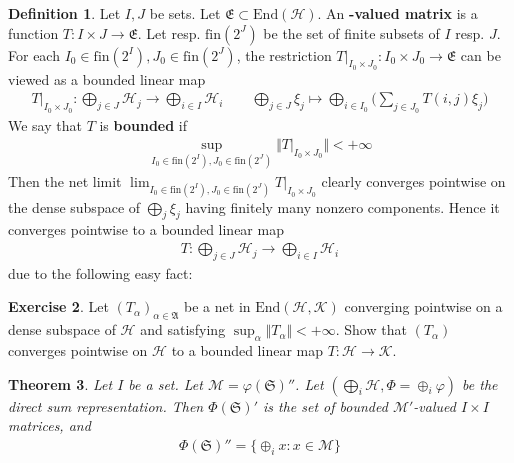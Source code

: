 \documentclass[12pt,b5paper,notitlepage]{article}
\theoremstyle{definition}
\newtheorem{df}{Definition}[section]
\newtheorem{exe}[df]{Exercise}
\theoremstyle{plain}
\newtheorem{thm}[df]{Theorem}
\newcommand{\fk}{\mathfrak}
\newcommand{\mc}{\mathcal}
\newcommand{\End}{\mathrm{End}} %
\newcommand{\fin}{\mathrm{fin}}
\numberwithin{equation}{section}
\begin{document}
\begin{df}
Let $I,J$ be sets. Let $\fk E\subset\End(\mc H)$. An \textbf{\pmb{$\fk E$}-valued  matrix} is a function $T:I\times J\rightarrow \fk E$. Let \pmb{$\fin(2^I)$} \index{fin@$\fin(2^I)$} resp. $\fin(2^J)$ be the set of finite subsets of $I$ resp. $J$. For each $I_0\in\fin(2^I),J_0\in\fin(2^J)$, the restriction $T|_{I_0\times J_0}:I_0\times J_0\rightarrow \fk E$ can be viewed as a bounded linear map
\begin{gather*}
T|_{I_0\times J_0}:\bigoplus_{j\in J}\mc H_j\rightarrow\bigoplus_{i\in I}\mc H_i\qquad \bigoplus_{j\in J}\xi_j\mapsto \bigoplus_{i\in I_0}\Big(\sum_{j\in J_0}T(i,j)\xi_j\Big) 
\end{gather*}
We say that $T$ is \textbf{bounded} if
\begin{align}
\sup_{I_0\in\fin(2^I),J_0\in\fin(2^J)}\Vert T|_{I_0\times J_0}\Vert<+\infty
\end{align}
Then the net limit $\lim_{I_0\in\fin(2^I),J_0\in\fin(2^J)} T|_{I_0\times J_0}$ clearly converges pointwise on the dense subspace of $\bigoplus_j\xi_j$ having finitely many nonzero components. Hence it converges pointwise to a bounded linear map
\begin{align*}
T:\bigoplus_{j\in J}\mc H_j\rightarrow\bigoplus_{i\in I}\mc H_i
\end{align*}
due to the following easy fact:
\end{df}

\begin{exe}
Let $(T_\alpha)_{\alpha\in\fk A}$ be a net in $\End(\mc H,\mc K)$ converging pointwise on a dense subspace of $\mc H$ and satisfying $\sup_\alpha\Vert T_\alpha\Vert<+\infty$. Show that $(T_\alpha)$ converges pointwise on $\mc H$ to a bounded linear map $T:\mc H\rightarrow\mc K$.
\end{exe}



\begin{thm}\label{lb80}
Let $I$ be a set. Let $\mc M=\varphi(\fk S)''$. Let $(\bigoplus_i\mc H,\Phi=\oplus_i\varphi)$ be the direct sum representation. Then $\Phi(\fk S)'$ is the set of bounded $\mc M'$-valued $I\times I$ matrices, and 
\begin{align*}
\Phi(\fk S)''=\{\oplus_i x:x\in\mc M\}
\end{align*}
\end{thm}
\end{document}
